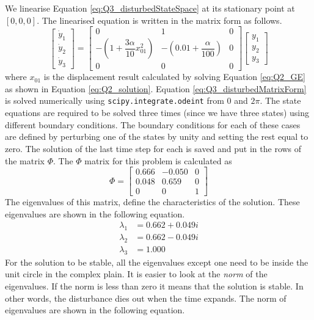 %
We linearise Equation \eqref{eq:Q3_disturbedStateSpace} at its stationary point at $\left[ 0, 0, 0 \right]$. The linearised equation is written in the matrix form as follows.
%
\begin{equation}\label{eq:Q3_disturbedMatrixForm}
\begin{bmatrix}
	\dot{y}_1 \\
	\dot{y}_2 \\
	\dot{y}_3
\end{bmatrix} = 
\begin{bmatrix}
	0 & 1 & 0 \\
	-\left( 1 + \dfrac{3 \alpha}{10} x_{01}^2 \right) & -\left( 0.01 + \dfrac{\alpha}{100} \right) & 0 \\
	0 & 0 & 0
\end{bmatrix}
\begin{bmatrix}
	y_1 \\
	y_2 \\
	y_3
\end{bmatrix}
\end{equation}
%
where $x_{01}$ is the displacement result calculated by solving Equation \eqref{eq:Q2_GE} as shown in Equation \eqref{eq:Q2_solution}. Equation \eqref{eq:Q3_disturbedMatrixForm} is solved numerically using \texttt{scipy.integrate.odeint} from $0$ and $2 \pi$. The state equations are required to be solved three times (since we have three states) using different boundary conditions. The boundary conditions for each of these cases are defined by perturbing one of the states by unity and setting the rest equal to zero. The solution of the last time step for each is saved and put in the rows of the matrix $\Phi$. The $\Phi$ matrix for this problem is calculated as
%
\begin{equation}
\Phi = 
\begin{bmatrix}
	0.666 & -0.050 & 0 \\
	0.048 & 0.659 & 0 \\
	0 & 0 & 1
\end{bmatrix}
\end{equation}
%
The eigenvalues of this matrix, define the characteristics of the solution. These eigenvalues are shown in the following equation.
%
\begin{align*}
	\lambda_1 &= 0.662 + 0.049 i \\
	\lambda_2 &= 0.662 - 0.049 i \\
	\lambda_3 &= 1.000
\end{align*}
%
For the solution to be stable, all the eigenvalues except one need to be inside the unit circle in the complex plain. It is easier to look at the \emph{norm} of the eigenvalues. If the norm is less than zero it means that the solution is stable. In other words, the disturbance dies out when the time expands. The norm of eigenvalues are shown in the following equation.

